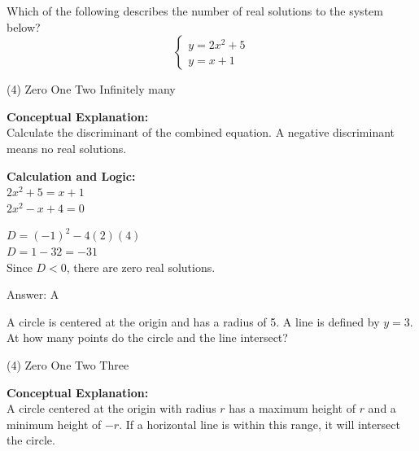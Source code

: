 \documentclass[11pt,paper=a4,answers]{exam}
\begin{document}
\begin{questions}
\vspace{40pt}

\question
Which of the following describes the number of real solutions to the system below?
\[ \begin{cases} y = 2x^2 + 5 \\ y = x + 1 \end{cases} \]
\begin{tasks}(4)
    \task Zero
    \task One
    \task Two
    \task Infinitely many
\end{tasks}

\begin{solution}
\textbf{Conceptual Explanation:} \\
Calculate the discriminant of the combined equation. A negative discriminant means no real solutions.

\vspace{20pt}

\textbf{Calculation and Logic:} \\
$2x^2 + 5 = x + 1$ \\
$2x^2 - x + 4 = 0$

\vspace{10pt}

$D = (-1)^2 - 4(2)(4)$ \\
$D = 1 - 32 = -31$ \\
Since $D < 0$, there are zero real solutions.

\vspace{25pt}

Answer: \colorbox{yellow!100}{A}
\end{solution}

\vspace{40pt}

\question
A circle is centered at the origin and has a radius of 5. A line is defined by $y = 3$. At how many points do the circle and the line intersect?
\begin{tasks}(4)
    \task Zero
    \task One
    \task Two
    \task Three
\end{tasks}

\begin{solution}
\textbf{Conceptual Explanation:} \\
A circle centered at the origin with radius $r$ has a maximum height of $r$ and a minimum height of $-r$. If a horizontal line is within this range, it will intersect the circle.


\end{solution}
\end{questions}
\end{document}

